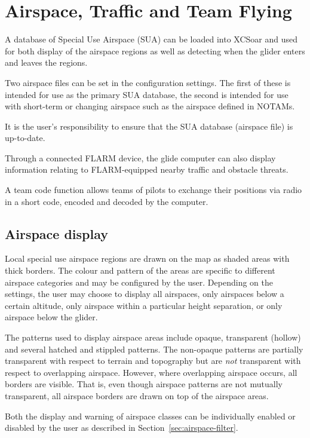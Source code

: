 \chapter{Airspace, Traffic and Team Flying}\label{cha:airspace}
A database of Special Use Airspace (SUA) can be loaded into XCSoar and
used for both display of the airspace regions as well as detecting
when the glider enters and leaves the regions.

Two airspace files can be set in the configuration settings.  The
first of these is intended for use as the primary SUA database, the
second is intended for use with short-term or changing airspace such
as the airspace defined in NOTAMs.

It is the user's responsibility to ensure that the SUA database
(air\-space file) is up-to-date.

Through a connected FLARM device, the glide computer can also
display information relating to FLARM-equipped nearby traffic
and obstacle threats.

A team code function allows teams of pilots to exchange their
positions via radio in a short code, encoded and decoded by the
computer.

\section{Airspace display}

Local special use airspace regions are drawn on the map as shaded
areas with thick borders.  The colour and pattern of the areas are
specific to different airspace categories and may be configured by the
user.  Depending on the settings, the user may choose to display all
airspaces, only airspaces below a certain altitude, only airspace within a
particular height separation, or only airspace below the glider.

The patterns used to display airspace areas include opaque,
transparent (hollow) and several hatched and stippled patterns.  The
non-opaque patterns are partially transparent with respect to terrain
and topography but are {\em not} transparent with respect to overlapping
airspace.  However, where overlapping airspace occurs, all borders are
visible.  That is, even though airspace patterns are not mutually
transparent, all airspace borders are drawn on top of the airspace
areas.

Both the display and warning of airspace classes can be individually
enabled or disabled by the user as described in
Section~\ref{sec:airspace-filter}.

